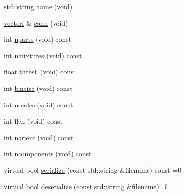 \begin{DoxyCompactItemize}
\item 
std\-::string \hyperlink{class_model_aeae6527ff13db7724c53c942029d882d}{name} (void)
\item 
\hyperlink{types_8hpp_a44529587d60e73bf0e689a82e5e70a55}{vectori} \& \hyperlink{class_model_a65d5e15900bc329b42acc7ce57c45628}{conn} (void)
\item 
int \hyperlink{class_model_aadbe1db9da272e3c7925f14c10143360}{nparts} (void) const 
\item 
int \hyperlink{class_model_a86676b7fdc842393897b11ce8a7d7623}{nmixtures} (void) const 
\item 
float \hyperlink{class_model_a474739b5b87ebfc7342d10124dfd59b6}{thresh} (void) const 
\item 
int \hyperlink{class_model_a93d5e6030b6ea9ffe155b459d9e58585}{binsize} (void) const 
\item 
int \hyperlink{class_model_a3de9632d7c459c2d7ea961be84005921}{nscales} (void) const 
\item 
int \hyperlink{class_model_ad9ff4f0d1dd752dd96f6ff4a47e3486d}{flen} (void) const 
\item 
int \hyperlink{class_model_ab64488cd01aa451323bf1e30603fbc73}{norient} (void) const 
\item 
int \hyperlink{class_model_acaee5d575cfdb39a4a6ebc3b765a88bc}{ncomponents} (void) const 
\item 
virtual bool \hyperlink{class_model_a952f21d72d87aa30387ea6e5c1d603fd}{serialize} (const std\-::string \&filename) const =0
\item 
virtual bool \hyperlink{class_model_a2fc5d668c4930e8172e1a1460a8e6b46}{deserialize} (const std\-::string \&filename)=0
\end{DoxyCompactItemize}
